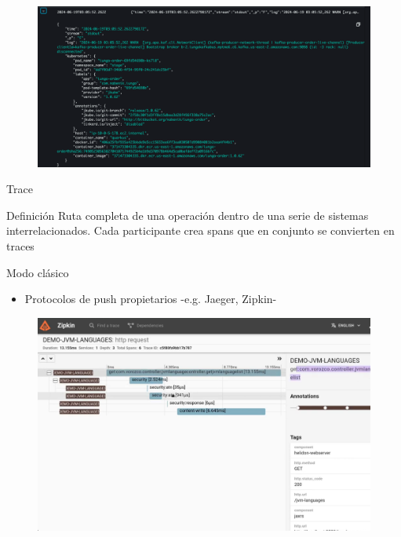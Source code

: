 \documentclass[aspectratio=169]{beamer}
\begin{document}
	\begin{frame}
		\begin{figure}
			\centering
			\includegraphics[width=0.8\linewidth]{Images/logs-sample}
			\label{fig:logs-sample}
		\end{figure}
	\end{frame}
	
	\begin{frame}{Trace}
		
		\begin{block}{Definición}
			Ruta completa de una operación dentro de una serie de sistemas interrelacionados. Cada participante crea spans que en conjunto se convierten en traces
		\end{block}	
		Modo clásico
		\begin{itemize}
			\item Protocolos de push propietarios -e.g. Jaeger, Zipkin-
		\end{itemize}	
	\end{frame}
	
	\begin{frame}
		\begin{figure}
			\centering
			\includegraphics[width=0.7\linewidth]{Images/trace-sample}
			\label{fig:trace-sample}
		\end{figure}
	\end{frame}
	
\end{document}
